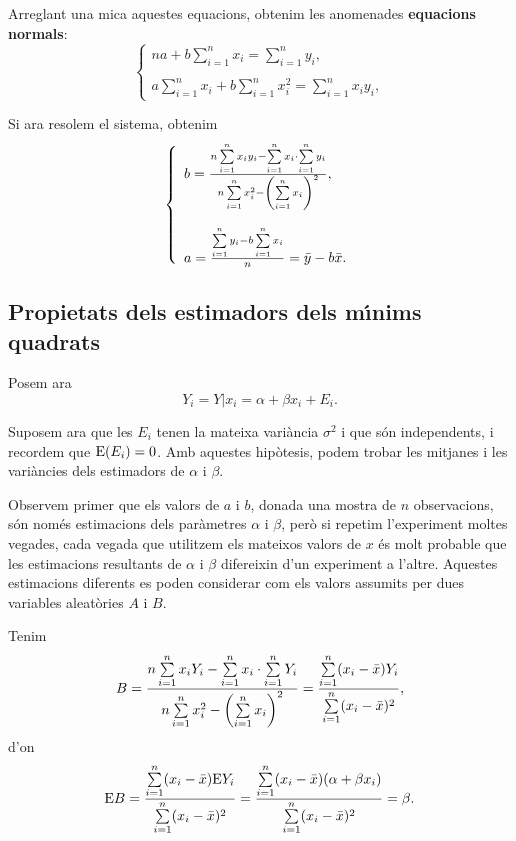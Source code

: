 Arreglant una mica aquestes equacions, obtenim les anomenades {\bf equacions
normals}:
$$\left\{ \begin{array}{l} n a + b \sum\limits_{i=1}^n x_i = \sum\limits_{i=1}^n
y_i,\\ \\ a \sum\limits_{i=1}^n x_i + b \sum\limits_{i=1}^n x_i^2 =
\sum\limits_{i=1}^n x_i y_i, \end{array} \right.$$

Si ara resolem el sistema, obtenim
$$\left\{ \begin{array}{l} b = {n \sum\limits_{i=1}^n x_i y_i - \sum\limits_{i=1}^n x_i \cdot
\sum\limits_{i=1}^n y_i \over n \sum\limits_{i=1}^n x_i^2 - \left( \sum\limits_{i=1}^n x_i
\right)^2},\\ \\ a = {\sum\limits_{i=1}^n y_i - b \sum\limits_{i=1}^n x_i 
\over n}=\bar{y}-b \bar{x}. \end{array}
\right.$$

\subsection{Propietats dels estimadors dels m\'{\i}nims quadrats}

Posem ara
$$Y_i = Y|x_i = \alpha + \beta x_i + E_i.$$

Suposem ara que les $E_i$ tenen la mateixa vari\`ancia $\sigma^2$ 
i que s\'on independents, i recordem que ${\rm E} (E_i) = 0$. 
Amb aquestes hip\`otesis, podem trobar les
mitjanes i les vari\`ancies dels estimadors de $\alpha$ i $\beta$.

Observem primer que els valors de $a$ i $b$, donada una mostra de $n$
observacions, s\'on nom\'es estimacions dels par\`ametres $\alpha$ i $\beta$, 
per\`o si
repetim l'experiment moltes vegades, cada vegada que utilitzem els mateixos
valors de $x$ \'es molt probable que les estimacions resultants de $\alpha$ i
$\beta$ difereixin d'un experiment a l'altre. 
Aquestes estimacions diferents es poden considerar com els valors assumits 
per dues variables aleat\`ories $A$ i $B$.

Tenim
$$B = {n \sum\limits_{i=1}^n x_i Y_i - \sum\limits_{i=1}^n x_i \cdot
\sum\limits_{i=1}^n Y_i \over n \sum\limits_{i=1}^n x_i^2 - \left(
\sum\limits_{i=1}^n x_i \right)^2} = {\sum\limits_{i=1}^n (x_i - \bar{x}) Y_i
\over \sum\limits_{i=1}^n (x_i - \bar{x})^2},$$
d'on
$${\rm E}B = {\sum\limits_{i=1}^n (x_i - \bar{x}) {\rm E}Y_i \over
\sum\limits_{i=1}^n (x_i - \bar{x})^2} = {\sum\limits_{i=1}^n (x_i - \bar{x})
(\alpha + \beta x_i) \over \sum\limits_{i=1}^n (x_i - \bar{x})^2} = \beta.$$

